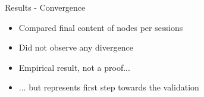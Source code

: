 \documentclass[10pt]{beamer}
\begin{document}

\begin{frame}{Results - Convergence}
  \begin{itemize}
    \item Compared final content of nodes per sessions
    \item Did not observe any divergence
    \bigskip
    \item Empirical result, not a proof...
    \item ... but represents first step towards the validation
  \end{itemize}
\end{frame}
\end{document}
